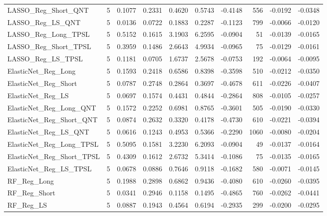 \begin{tabular}{llrrrrrrrr}
\cline{1-10}
LASSO\_Reg\_Short\_QNT & 5 & 0.1077 & 0.2331 & 0.4620 & 0.5743 & -0.4148 & 556 & -0.0192 & -0.0348 \\
\cline{1-10}
LASSO\_Reg\_LS\_QNT & 5 & 0.0136 & 0.0722 & 0.1883 & 0.2287 & -0.1123 & 799 & -0.0066 & -0.0120 \\
\cline{1-10}
LASSO\_Reg\_Long\_TPSL & 5 & 0.5152 & 0.1615 & 3.1903 & 6.2595 & -0.0904 & 51 & -0.0139 & -0.0165 \\
\cline{1-10}
LASSO\_Reg\_Short\_TPSL & 5 & 0.3959 & 0.1486 & 2.6643 & 4.9934 & -0.0965 & 75 & -0.0129 & -0.0161 \\
\cline{1-10}
LASSO\_Reg\_LS\_TPSL & 5 & 0.1181 & 0.0705 & 1.6737 & 2.5678 & -0.0753 & 192 & -0.0064 & -0.0095 \\
\cline{1-10}
ElasticNet\_Reg\_Long & 5 & 0.1593 & 0.2418 & 0.6586 & 0.8398 & -0.3598 & 510 & -0.0212 & -0.0350 \\
\cline{1-10}
ElasticNet\_Reg\_Short & 5 & 0.0787 & 0.2748 & 0.2864 & 0.3697 & -0.4678 & 611 & -0.0226 & -0.0407 \\
\cline{1-10}
ElasticNet\_Reg\_LS & 5 & 0.0697 & 0.1574 & 0.4431 & 0.4844 & -0.2864 & 808 & -0.0105 & -0.0257 \\
\cline{1-10}
ElasticNet\_Reg\_Long\_QNT & 5 & 0.1572 & 0.2252 & 0.6981 & 0.8765 & -0.3601 & 505 & -0.0190 & -0.0330 \\
\cline{1-10}
ElasticNet\_Reg\_Short\_QNT & 5 & 0.0874 & 0.2632 & 0.3320 & 0.4178 & -0.4730 & 610 & -0.0221 & -0.0394 \\
\cline{1-10}
ElasticNet\_Reg\_LS\_QNT & 5 & 0.0616 & 0.1243 & 0.4953 & 0.5366 & -0.2290 & 1060 & -0.0080 & -0.0204 \\
\cline{1-10}
ElasticNet\_Reg\_Long\_TPSL & 5 & 0.5095 & 0.1581 & 3.2230 & 6.2093 & -0.0904 & 49 & -0.0137 & -0.0164 \\
\cline{1-10}
ElasticNet\_Reg\_Short\_TPSL & 5 & 0.4309 & 0.1612 & 2.6732 & 5.3414 & -0.1086 & 75 & -0.0135 & -0.0165 \\
\cline{1-10}
ElasticNet\_Reg\_LS\_TPSL & 5 & 0.0678 & 0.0886 & 0.7646 & 0.9118 & -0.1682 & 580 & -0.0071 & -0.0145 \\
\cline{1-10}
RF\_Reg\_Long & 5 & 0.1988 & 0.2898 & 0.6862 & 0.9436 & -0.4080 & 610 & -0.0260 & -0.0395 \\
\cline{1-10}
RF\_Reg\_Short & 5 & 0.0341 & 0.2946 & 0.1158 & 0.1495 & -0.4865 & 760 & -0.0262 & -0.0441 \\
\cline{1-10}
RF\_Reg\_LS & 5 & 0.0887 & 0.1943 & 0.4564 & 0.6194 & -0.2935 & 299 & -0.0200 & -0.0295 \\

\end{tabular}

